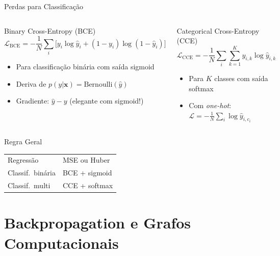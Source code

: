 \documentclass[7pt, aspectratio=169,10pt]{beamer}
\newcommand{\bx}{\bm{x}}
\begin{document}
\begin{frame}{Perdas para Classificação}
\begin{columns}[T]
\begin{block}{Binary Cross-Entropy (BCE)}
\[
\mathcal{L}_{\text{BCE}} = -\frac{1}{N}\sum_i \bigl[y_i\log\hat{y}_i + (1-y_i)\log(1-\hat{y}_i)\bigr]
\]
\begin{itemize}
  \item Para classificação binária com saída sigmoid
  \item Deriva de $p(y|\bx) = \text{Bernoulli}(\hat{y})$
  \item Gradiente: $\hat{y} - y$ (elegante com sigmoid!)
\end{itemize}
\end{block}
\begin{block}{Categorical Cross-Entropy (CCE)}
\[
\mathcal{L}_{\text{CCE}} = -\frac{1}{N}\sum_i \sum_{k=1}^K y_{i,k}\log\hat{y}_{i,k}
\]
\begin{itemize}
  \item Para $K$ classes com saída softmax
  \item Com \textit{one-hot}: $\mathcal{L} = -\frac{1}{N}\sum_i \log\hat{y}_{i,c_i}$
\end{itemize}
\end{block}
\end{columns}
\begin{alertblock}{Regra Geral}
\small
\begin{tabular}{ll}
Regressão & MSE ou Huber \\
Classif.\ binária & BCE + sigmoid \\
Classif.\ multi & CCE + softmax \\
\end{tabular}
\end{alertblock}
\end{frame}

\section{Backpropagation e Grafos Computacionais}
\end{document}
